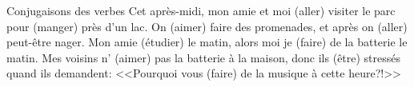 \begin{frame}{Conjugaisons des verbes }
  Cet après-midi, mon amie et moi \underline{} (aller) visiter le parc pour \underline{} (manger) près d'un lac.
  On \underline{} (aimer) faire des promenades, et après on \underline{} (aller) peut-être nager.
  Mon amie \underline{} (étudier) le matin, alors moi je \underline{} (faire) de la batterie le matin.
  Mes voisins n'\underline{} (aimer) pas la batterie à la maison, donc ils \underline{} (être) stressés quand ils demandent: <<Pourquoi vous \underline{} (faire) de la musique à cette heure?!>>
\end{frame}
